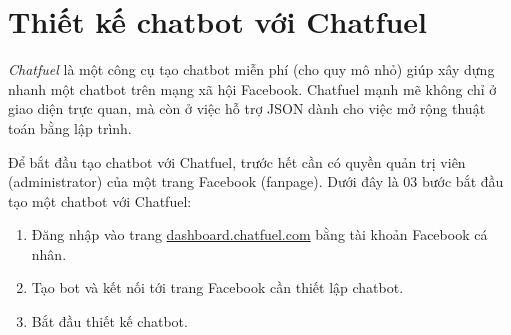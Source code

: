 \chapter{Thiết kế chatbot với Chatfuel}
\textit{Chatfuel} là một công cụ tạo chatbot miễn phí (cho quy mô nhỏ) giúp xây dựng nhanh một chatbot trên mạng xã hội Facebook. Chatfuel mạnh mẽ không chỉ ở giao diện trực quan, mà còn ở việc hỗ trợ JSON dành cho việc mở rộng thuật toán bằng lập trình.\par
Để bắt đầu tạo chatbot với Chatfuel, trước hết cần có quyền quản trị viên (administrator) của một trang Facebook (fanpage). Dưới đây là 03 bước bắt đầu tạo một chatbot với Chatfuel:
\begin{enumerate}[label=\textbf{\arabic*.}]
	\item Đăng nhập vào trang \underline{dashboard.chatfuel.com} bằng tài khoản Facebook cá nhân.
	\item Tạo bot và kết nối tới trang Facebook cần thiết lập chatbot.
	\item Bắt đầu thiết kế chatbot.
\end{enumerate}\par
